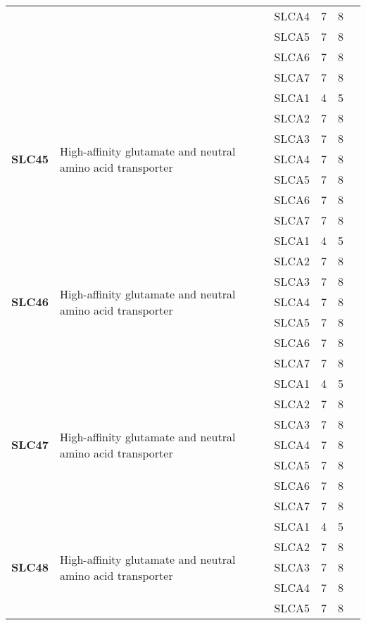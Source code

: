 \documentclass[12pt]{report}
\begin{document}
\begin{center}
\begin{longtable}{|p{1.5cm}|p{3.2cm}|p{1.9cm}|p{1.65cm}|p{3cm}|p{3cm}|}
\cline{3-6}
&&SLCA4&7 & 8&\\ 
\cline{3-6}
&&SLCA5&7 & 8&\\ 
\cline{3-6}
&&SLCA6&7 & 8&\\ 
\cline{3-6}
&&SLCA7&7 & 8&\\ 
\hline
\multirow{7}{1.5cm}{\textbf{SLC45}} & \multirow{7}{4cm}{High-affinity glutamate and neutral amino acid transporter} & SLCA1 & 4 & 5\\ 
\cline{3-6}
&&SLCA2&7 & 8&\\ 
\cline{3-6}
&&SLCA3&7 & 8&\\ 
\cline{3-6}
&&SLCA4&7 & 8&\\ 
\cline{3-6}
&&SLCA5&7 & 8&\\ 
\cline{3-6}
&&SLCA6&7 & 8&\\ 
\cline{3-6}
&&SLCA7&7 & 8&\\ 
\hline
\multirow{7}{1.5cm}{\textbf{SLC46}} & \multirow{7}{4cm}{High-affinity glutamate and neutral amino acid transporter} & SLCA1 & 4 & 5\\ 
\cline{3-6}
&&SLCA2&7 & 8&\\ 
\cline{3-6}
&&SLCA3&7 & 8&\\ 
\cline{3-6}
&&SLCA4&7 & 8&\\ 
\cline{3-6}
&&SLCA5&7 & 8&\\ 
\cline{3-6}
&&SLCA6&7 & 8&\\ 
\cline{3-6}
&&SLCA7&7 & 8&\\ 
\hline
\multirow{7}{1.5cm}{\textbf{SLC47}} & \multirow{7}{4cm}{High-affinity glutamate and neutral amino acid transporter} & SLCA1 & 4 & 5\\ 
\cline{3-6}
&&SLCA2&7 & 8&\\ 
\cline{3-6}
&&SLCA3&7 & 8&\\ 
\cline{3-6}
&&SLCA4&7 & 8&\\ 
\cline{3-6}
&&SLCA5&7 & 8&\\ 
\cline{3-6}
&&SLCA6&7 & 8&\\ 
\cline{3-6}
&&SLCA7&7 & 8&\\ 
\hline
\multirow{7}{1.5cm}{\textbf{SLC48}} & \multirow{7}{4cm}{High-affinity glutamate and neutral amino acid transporter} & SLCA1 & 4 & 5\\ 
\cline{3-6}
&&SLCA2&7 & 8&\\ 
\cline{3-6}
&&SLCA3&7 & 8&\\ 
\cline{3-6}
&&SLCA4&7 & 8&\\ 
\cline{3-6}
&&SLCA5&7 & 8&\\ 

\end{longtable}
\end{center}
\end{document}

